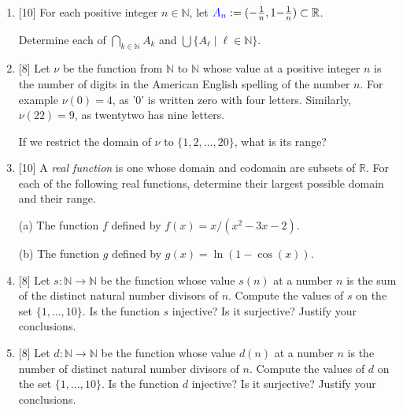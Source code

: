 \documentclass[12pt]{article}
\newcommand{\defn}[1]{{\color{blue}\sl #1}}
\newcommand{\deco}[1]{{\color{blue} #1}}
\newcommand{\NN}{{\mathbb N}}
\newcommand{\RR}{{\mathbb R}}
\begin{document}
\begin{enumerate}
\item{[10]}   For each positive integer $n\in\NN$, let $\deco{A_n}:=(-\frac{1}{n}, 1{-}\frac{1}{n})\subset\RR$.
  
  Determine each of \qquad ${\displaystyle \bigcap_{k\in\NN} A_k}$ \qquad and \qquad 
  $\bigcup\{ A_\ell\mid \ell\in\NN\}$.



\item{[8]}   Let $\nu$ be the function from $\NN$ to $\NN$ whose value at a positive integer $n$ is the number of digits in the American
  English spelling of the number $n$.
  For example $\nu(0)=4$, as '0' is written {\sf zero} with four letters.
  Similarly, $\nu(22)=9$, as {\sf twentytwo} has nine letters.

  If we restrict the domain of $\nu$ to $\{1,2,\dotsc,20\}$, what is its range?

\item{[10]} A \defn{real function} is one whose domain and codomain are subsets of $\RR$.
  For each of the following real functions, determine their largest possible domain and their range.

  (a) The function $f$ defined by $f(x)=x/(x^2-3x-2)$.

  (b) The function $g$ defined by $g(x)=\ln(1-\cos(x))$.


\item{[8]}  Let $s\colon\NN\to\NN$ be the function whose value $s(n)$ at a number $n$ is the sum of the distinct natural number divisors of
  $n$. 
  Compute the values of $s$ on the set $\{1,\dotsc,10\}$.
  Is the function $s$ injective?  Is it surjective?  Justify your conclusions.



\item{[8]}  Let $d\colon\NN\to\NN$ be the function whose value $d(n)$ at a number $n$ is the number of distinct natural number divisors of
  $n$. 
  Compute the values of $d$ on the set $\{1,\dotsc,10\}$.
  Is the function $d$ injective?  Is it surjective?  Justify your conclusions.


\end{enumerate}
\end{document}
